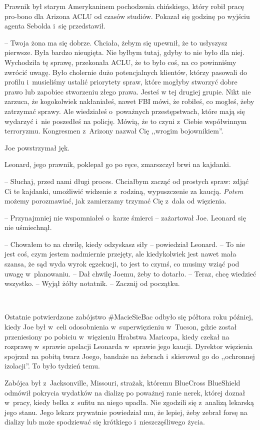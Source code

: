 \documentclass[oneside,polish,11pt,sfheadings]{mwbk}
\begin{document}
Prawnik był starym Amerykaninem pochodzenia chińskiego, który robił
pracę pro-bono dla Arizona ACLU od czasów studiów. Pokazał się godzinę
po wyjściu agenta Sebolda i~się przedstawił.

-- Twoja żona ma się dobrze. Chciała, żebym się upewnił, że to usłyszysz
pierwsze. Była bardzo nieugięta. Nie byłbym tutaj, gdyby to nie było dla
niej. Wychodziła tę sprawę, przekonała ACLU, że to było coś, na co
powinniśmy zwrócić uwagę. Było cholernie dużo potencjalnych klientów,
którzy pasowali do profilu i~musieliśmy ustalić priorytety spraw, które
mogłyby stworzyć dobre prawo lub zapobiec stworzeniu złego prawa. Jesteś
w tej drugiej grupie. Nikt nie zarzuca, że kogokolwiek nakłaniałeś,
nawet FBI mówi, że robiłeś, co mogłeś, żeby zatrzymać sprawy. Ale
wiedziałeś o~poważnych przestępstwach, które mają się wydarzyć i~nie
poszedłeś na policję. Mówią, że to czyni z~Ciebie współwinnym
terroryzmu. Kongresmen z~Arizony nazwał Cię ,,wrogim bojownikiem''.

Joe powstrzymał jęk.

Leonard, jego prawnik, poklepał go po ręce, zmarszczył brwi na kajdanki.

-- Słuchaj, przed nami długi proces. Chciałbym zacząć od prostych spraw:
zdjąć Ci te kajdanki, umożliwić widzenie z~rodziną, wypuszczenie za
kaucją. \textit{Potem} możemy porozmawiać, jak zamierzamy trzymać Cię z~dala od więzienia.

-- Przynajmniej nie wspomniałeś o~karze śmierci -- zażartował Joe. Leonard
się nie uśmiechnął.

-- Chowałem to na chwilę, kiedy odzyskasz siły -- powiedział Leonard. -- To
nie jest coś, czym jestem nadmiernie przejęty, ale kiedykolwiek jest
nawet mała szansa, że sąd wyda wyrok egzekucji, to jest to czymś, co
musimy wziąć pod uwagę w~planowaniu. -- Dał chwilę Joemu, żeby to
dotarło. -- Teraz, chcę wiedzieć wszystko. -- Wyjął żółty notatnik. -- Zacznij od początku.

~

Ostatnie potwierdzone zabójstwo \#MacieSieBac odbyło się półtora roku
później, kiedy Joe był w~celi odosobnienia w~superwięzieniu w~Tucson,
gdzie został przeniesiony po pobiciu w~więzieniu Hrabstwa Maricopa,
kiedy czekał na rozprawę w~sprawie apelacji Leonarda w~sprawie jego
kaucji. Dyrektor więzienia spojrzał na pobitą twarz Joego, bandaże na
żebrach i~skierował go do ,,ochronnej izolacji''. To było tydzień temu.

Zabójca był z~Jacksonville, Missouri, strażak, któremu BlueCross
BlueShield odmówił pokrycia wydatków na dializę po poważnej ranie nerek,
której doznał w~pracy, kiedy belka z~sufitu na niego upadła. Nie
zgodzili się z~analizą lekarską jego stanu. Jego lekarz prywatnie
powiedział mu, że lepiej, żeby zebrał forsę na dializy lub może
spodziewać się krótkiego i~nieszczęśliwego życia.
\end{document}

